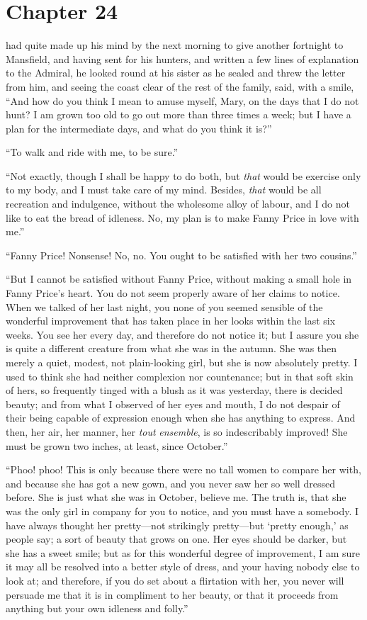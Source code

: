 \chapter{Chapter 24}

 had quite made up his mind by the
next morning to give another fortnight to Mansfield,
and having sent for his hunters, and written a few
lines of explanation to the Admiral, he looked round at
his sister as he sealed and threw the letter from him,
and seeing the coast clear of the rest of the family,
said, with a smile, ``And how do you think I mean to
amuse myself, Mary, on the days that I do not hunt?
I am grown too old to go out more than three times a week;
but I have a plan for the intermediate days, and what do you think
it is?''

``To walk and ride with me, to be sure.''

``Not exactly, though I shall be happy to do both, but \emph{that}
would be exercise only to my body, and I must take care
of my mind.  Besides, \emph{that} would be all recreation
and indulgence, without the wholesome alloy of labour,
and I do not like to eat the bread of idleness.  No, my plan
is to make Fanny Price in love with me.''

``Fanny Price!  Nonsense!  No, no.  You ought to be
satisfied with her two cousins.''

``But I cannot be satisfied without Fanny Price,
without making a small hole in Fanny Price's heart.
You do not seem properly aware of her claims to notice.
When we talked of her last night, you none of you
seemed sensible of the wonderful improvement that has
taken place in her looks within the last six weeks.
You see her every day, and therefore do not notice it;
but I assure you she is quite a different creature
from what she was in the autumn.  She was then merely
a quiet, modest, not plain-looking girl, but she is now
absolutely pretty.  I used to think she had neither
complexion nor countenance; but in that soft skin of hers,
so frequently tinged with a blush as it was yesterday,
there is decided beauty; and from what I observed of her
eyes and mouth, I do not despair of their being capable
of expression enough when she has anything to express.
And then, her air, her manner, her \emph{tout} \emph{ensemble},
is so indescribably improved!  She must be grown two inches,
at least, since October.''

``Phoo! phoo!  This is only because there were no tall women
to compare her with, and because she has got a new gown,
and you never saw her so well dressed before.  She is
just what she was in October, believe me.  The truth is,
that she was the only girl in company for you to notice,
and you must have a somebody.  I have always thought
her pretty---not strikingly pretty---but `pretty enough,'
as people say; a sort of beauty that grows on one.
Her eyes should be darker, but she has a sweet smile;
but as for this wonderful degree of improvement, I am
sure it may all be resolved into a better style of dress,
and your having nobody else to look at; and therefore,
if you do set about a flirtation with her, you never
will persuade me that it is in compliment to her beauty,
or that it proceeds from anything but your own idleness
and folly.''

